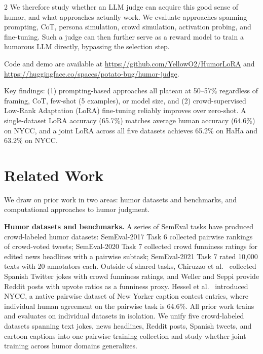 \documentclass[10pt, a4paper]{article}
\begin{document}
\begin{multicols}{2}
We therefore study whether an LLM judge can acquire this good sense of humor, and what approaches actually work. We evaluate approaches spanning prompting, CoT, persona simulation, crowd simulation, activation probing, and fine-tuning. Such a judge can then further serve as a reward model to train a humorous LLM directly, bypassing the selection step.

Code and demo are available at \url{https://github.com/YellowO2/HumorLoRA} and \url{https://huggingface.co/spaces/potato-bug/humor-judge}.

Key findings: (1) prompting-based approaches all plateau at 50--57\% regardless of framing, CoT, few-shot (5 examples), or model size, and (2) crowd-supervised Low-Rank Adaptation (LoRA) fine-tuning reliably improves over zero-shot. A single-dataset LoRA accuracy (65.7\%) matches average human accuracy (64.6\%) on NYCC, and a joint LoRA across all five datasets achieves 65.2\% on HaHa and 63.2\% on NYCC.

\section{Related Work}

We draw on prior work in two areas: humor datasets and benchmarks, and computational approaches to humor judgment.

\textbf{Humor datasets and benchmarks.} A series of SemEval tasks have produced crowd-labeled humor datasets: SemEval-2017 Task 6 \cite{potash2017} collected pairwise rankings of crowd-voted tweets; SemEval-2020 Task 7 \cite{hossain2020} collected crowd funniness ratings for edited news headlines with a pairwise subtask; SemEval-2021 Task 7 \cite{meaney2021} rated 10,000 texts with 20 annotators each. Outside of shared tasks, Chiruzzo et al.\ \cite{chiruzzo2019} collected Spanish Twitter jokes with crowd funniness ratings, and Weller and Seppi \cite{weller2019} provide Reddit posts with upvote ratios as a funniness proxy. Hessel et al.\ \cite{hessel2023} introduced NYCC, a native pairwise dataset of New Yorker caption contest entries, where individual human agreement on the pairwise task is 64.6\%. All prior work trains and evaluates on individual datasets in isolation. We unify five crowd-labeled datasets spanning text jokes, news headlines, Reddit posts, Spanish tweets, and cartoon captions into one pairwise training collection and study whether joint training across humor domains generalizes.


\end{multicols}
\end{document}
